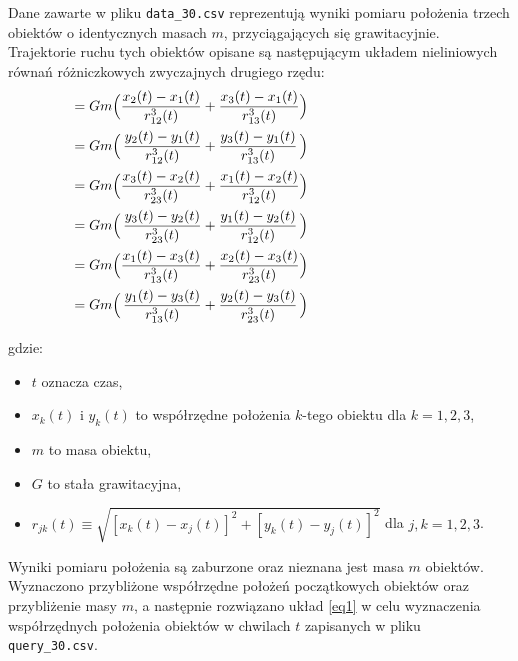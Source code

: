 \documentclass[a4paper, 12pt, twoside, openany]{article}
\begin{document}
	Dane zawarte w pliku \texttt{data\_30.csv} reprezentują wyniki pomiaru położenia trzech obiektów o
	identycznych masach $m$, przyciągających się grawitacyjnie. Trajektorie ruchu tych obiektów opisane
	są następującym układem nieliniowych równań różniczkowych zwyczajnych drugiego rzędu:
	\begin{equation}	
		\label{eq1}
		\hspace{-5cm}
		\left\{
		\begin{alignedat}{4}
			\dfrac{d^2x_1(t)}{dt^2} & = Gm \Big( & \dfrac{x_2(t) - x_1(t)}{r^3_{12}(t)} & + \dfrac{x_3(t) - x_1(t)}{r^3_{13}(t)} & \Big) \\
			\dfrac{d^2y_1(t)}{dt^2} & = Gm \Big( & \dfrac{y_2(t) - y_1(t)}{r^3_{12}(t)} & + \dfrac{y_3(t) - y_1(t)}{r^3_{13}(t)} & \Big) \\
			\dfrac{d^2x_2(t)}{dt^2} & = Gm \Big( & \dfrac{x_3(t) - x_2(t)}{r^3_{23}(t)} & + \dfrac{x_1(t) - x_2(t)}{r^3_{12}(t)} & \Big) \\
			\dfrac{d^2y_2(t)}{dt^2} & = Gm \Big( & \dfrac{y_3(t) - y_2(t)}{r^3_{23}(t)} & + \dfrac{y_1(t) - y_2(t)}{r^3_{12}(t)} & \Big) \\
			\dfrac{d^2x_3(t)}{dt^2} & = Gm \Big( & \dfrac{x_1(t) - x_3(t)}{r^3_{13}(t)} & + \dfrac{x_2(t) - x_3(t)}{r^3_{23}(t)} & \Big) \\
			\dfrac{d^2y_3(t)}{dt^2} & = Gm \Big( & \dfrac{y_1(t) - y_3(t)}{r^3_{13}(t)} & + \dfrac{y_2(t) - y_3(t)}{r^3_{23}(t)} & \Big)
		\end{alignedat}
		\right.
	\end{equation}

	gdzie:
	\begin{itemize}[label=\footnotesize$\bullet$, topsep=0pt, parsep=0pt, leftmargin=10mm]
		\item $t$ oznacza czas,
		\item $x_k(t)$ i $y_k(t)$ to współrzędne położenia $k$-tego obiektu dla $k = 1,2,3$,
		\item $m$ to masa obiektu,
		\item $G$ to stała grawitacyjna,
		\item $r_{jk}(t) \equiv \sqrt{\left[x_k(t) - x_j(t)\right]^2 + \left[y_k(t) - y_j(t)\right]^2}$ dla $j,k = 1,2,3$.\\
	\end{itemize}
	\noindent
	Wyniki pomiaru położenia są zaburzone oraz nieznana jest masa $m$ obiektów. Wyznaczono przybliżone współrzędne położeń początkowych obiektów oraz przybliżenie masy $m$, a następnie rozwiązano układ \eqref{eq1} w celu wyznaczenia współrzędnych położenia obiektów w chwilach $t$ zapisanych w pliku \texttt{query\_30.csv}.
	
\end{document}
